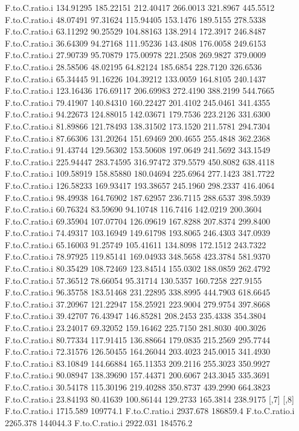 \documentclass[11pt]{article} %
\begin{document}
\begin{Schunk}
\begin{Soutput}
F.to.C.ratio.i 134.91295 185.22151 212.40417 266.0013 321.8967 445.5512
F.to.C.ratio.i  48.07491  97.31624 115.94405 153.1476 189.5155 278.5338
F.to.C.ratio.i  63.11292  90.25529 104.88163 138.2914 172.3917 246.8487
F.to.C.ratio.i  36.64309  94.27168 111.95236 143.4808 176.0058 249.6153
F.to.C.ratio.i  27.90739  95.70879 175.00978 221.2508 269.9827 379.0009
F.to.C.ratio.i  28.58506  48.02195  64.82124 185.6854 228.7120 326.6536
F.to.C.ratio.i  65.34445  91.16226 104.39212 133.0059 164.8105 240.1437
F.to.C.ratio.i 123.16436 176.69117 206.69983 272.4190 388.2199 544.7665
F.to.C.ratio.i  79.41907 140.84310 160.22427 201.4102 245.0461 341.4355
F.to.C.ratio.i  94.22673 124.88015 142.03671 179.7536 223.2126 331.6300
F.to.C.ratio.i  81.89866 121.78493 138.31502 173.1520 211.5781 294.7304
F.to.C.ratio.i  87.66306 131.20264 151.69469 200.4655 255.4848 362.2368
F.to.C.ratio.i  91.43744 129.56302 153.50608 197.0649 241.5692 343.1549
F.to.C.ratio.i 225.94447 283.74595 316.97472 379.5579 450.8082 638.4118
F.to.C.ratio.i 109.58919 158.85880 180.04694 225.6964 277.1423 381.7722
F.to.C.ratio.i 126.58233 169.93417 193.38657 245.1960 298.2337 416.4064
F.to.C.ratio.i  98.49938 164.76902 187.62957 236.7115 288.6537 398.5939
F.to.C.ratio.i  60.76324  83.59690  94.10748 116.7416 142.0219 200.3604
F.to.C.ratio.i  69.35904 107.07704 126.09619 167.8288 207.8374 299.8400
F.to.C.ratio.i  74.49317 103.16949 149.61798 193.8065 246.4303 347.0939
F.to.C.ratio.i  65.16003  91.25749 105.41611 134.8098 172.1512 243.7322
F.to.C.ratio.i  78.97925 119.85141 169.04933 348.5658 423.3784 581.9370
F.to.C.ratio.i  80.35429 108.72469 123.84514 155.0302 188.0859 262.4792
F.to.C.ratio.i  57.36512  78.66054  95.31714 130.5357 160.7258 227.9155
F.to.C.ratio.i  96.35758 183.51468 231.22895 338.8995 444.7903 618.6645
F.to.C.ratio.i  37.20967 121.22947 158.25921 223.9004 279.9754 397.8668
F.to.C.ratio.i  39.42707  76.43947 146.85281 208.2453 235.4338 354.3804
F.to.C.ratio.i  23.24017  69.32052 159.16462 225.7150 281.8030 400.3026
F.to.C.ratio.i  80.77334 117.91415 136.88664 179.0835 215.2569 295.7744
F.to.C.ratio.i  72.31576 126.50455 164.26044 203.4023 245.0015 341.4930
F.to.C.ratio.i  83.10849 144.66884 165.11353 209.2116 255.3023 350.9927
F.to.C.ratio.i  90.08947 138.39690 157.44371 200.6067 243.3045 335.3691
F.to.C.ratio.i  30.54178 115.30196 219.40288 350.8737 439.2990 664.3823
F.to.C.ratio.i  23.84193  80.41639 100.86144 129.2733 165.3814 238.9175
                   [,7]     [,8]
F.to.C.ratio.i 1715.589 109774.1
F.to.C.ratio.i 2937.678 186859.4
F.to.C.ratio.i 2265.378 144044.3
F.to.C.ratio.i 2922.031 184576.2

\end{Soutput}
\end{Schunk}
\end{document}
